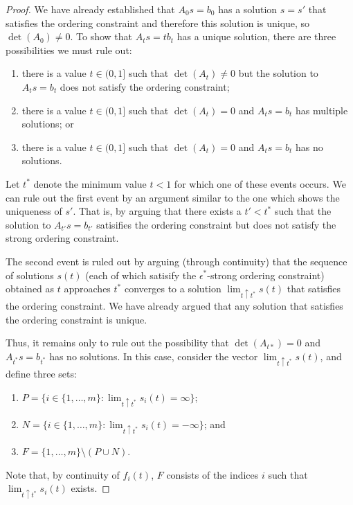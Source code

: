 \documentclass{patmorin}
\begin{document}
\begin{proof}
   We have already established that $A_0s=b_0$ has a solution $s=s'$
   that satisfies the ordering constraint and therefore this solution
   is unique, so
   $\det(A_0)\neq 0$.  To show that $A_ts=tb_t$ has a unique solution,
   there are three possibilities we must rule out:
   \begin{enumerate}
     \item there is a value $t\in(0,1]$ such that $\det(A_t)\neq 0$ but
     the solution to $A_t s=b_t$ does not satisfy the ordering constraint;
     \item there is a value $t\in(0,1]$ such that $\det(A_t)=0$ and $A_t
     s=b_t$ has multiple solutions; or
     \item there is a value $t\in(0,1]$ such that $\det(A_t)=0$ and $A_t
     s=b_t$ has no solutions.
   \end{enumerate}
   Let $t^*$ denote the minimum value $t<1$ for which one of these
   events occurs.  We can rule out the first event by an argument
   similar to the one which shows the uniqueness of $s'$.  That is,
   by arguing that there exists a $t'<t^*$ such that the solution to
   $A_{t'}s=b_{t'}$ satisifies the ordering constraint but does not
   satisfy the strong ordering constraint.  

   The second event is ruled out by arguing (through continuity)
   that the sequence of solutions $s(t)$ (each of which satisify the
   $\epsilon^*$-strong ordering constraint) obtained as $t$ approaches
   $t^*$ converges to a solution $\lim_{t\uparrow t^*} s(t)$ that
   satisfies the ordering constraint.  We have already argued that any
   solution that satisfies the ordering constraint is unique.

   Thus, it remains only to rule out the possibility that $\det(A_{t*})=0$
   and $A_{t^*}s=b_{t^*}$ has no solutions.  In this case, consider the
   vector $\lim_{t\uparrow t^*} s(t)$, and define three sets:
   \begin{enumerate}
     \item $P=\{i\in \{1,\ldots,m\}:\lim_{t\uparrow t^*} s_i(t)=\infty\}$;
     \item $N=\{i\in \{1,\ldots,m\}:\lim_{t\uparrow t^*} s_i(t)=-\infty\}$; and
     \item $F=\{1,\ldots,m\}\setminus (P\cup N)$.
   \end{enumerate}
   Note that, by continuity of $f_i(t)$, $F$ consists of the indices $i$
   such that $\lim_{t\uparrow t^*} s_i(t)$ exists.



\end{proof}
\end{document}
